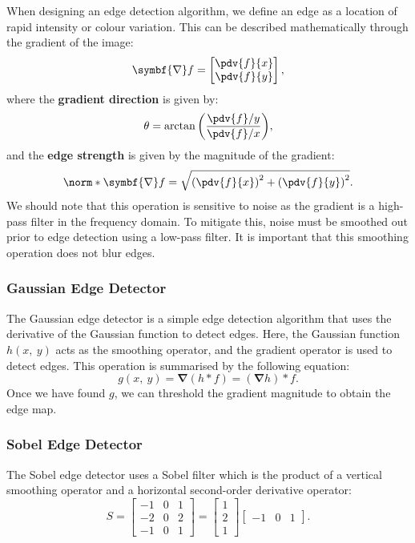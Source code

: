 \documentclass{article}
\begin{document}
When designing an edge detection algorithm, we define an edge as a
location of rapid intensity or colour variation. This can be described
mathematically through the gradient of the image:
\begin{equation*}
    \symbf{\nabla} f =
    \begin{bmatrix}
        \displaystyle\pdv{f}{x} \\ \displaystyle\pdv{f}{y}
    \end{bmatrix}
    ,
\end{equation*}
where the \textbf{gradient direction} is given by:
\begin{equation*}
    \theta = \arctan{\left( \frac{\pdv{f}/{y}}{\pdv{f}/{x}} \right)},
\end{equation*}
and the \textbf{edge strength} is given by the magnitude of the gradient:
\begin{equation*}
    \norm*{\symbf{\nabla} f} = \sqrt{\left( \pdv{f}{x} \right)^2 + \left( \pdv{f}{y} \right)^2}.
\end{equation*}
We should note that this operation is sensitive to noise as the gradient
is a high-pass filter in the frequency domain. To mitigate this, noise
must be smoothed out prior to edge detection using a low-pass filter.
It is important that this smoothing operation does not blur edges.
\subsubsection{Gaussian Edge Detector}
The Gaussian edge detector is a simple edge detection algorithm that
uses the derivative of the Gaussian function to detect edges. Here, the
Gaussian function \(h\left( x,\: y \right)\) acts as the smoothing
operator, and the gradient operator is used to detect edges. This
operation is summarised by the following equation:
\begin{equation*}
    g\left( x,\: y \right) = \symbf{\nabla} \left( h \ast f \right) = \left( \symbf{\nabla} h \right) \ast f.
\end{equation*}
Once we have found \(g\), we can threshold the gradient magnitude to
obtain the edge map.
\subsubsection{Sobel Edge Detector}
The Sobel edge detector uses a Sobel filter which is the product of a
vertical smoothing operator and a horizontal second-order derivative
operator:
\begin{equation*}
    S =
    \begin{bmatrix}
        -1 & 0 & 1 \\ -2 & 0 & 2 \\ -1 & 0 & 1
    \end{bmatrix}
    =
    \begin{bmatrix}
        1 \\ 2 \\ 1
    \end{bmatrix}
    \begin{bmatrix}
        -1 & 0 & 1
    \end{bmatrix}
    .
\end{equation*}
\end{document}
